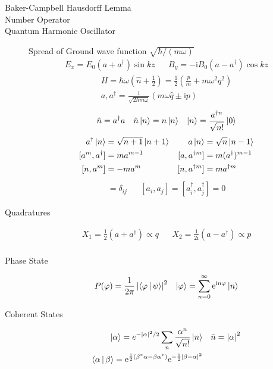 \documentclass[twocolumn, 11pt]{article}
\renewcommand{\i}{\mathrm{i}}
\newcommand{\e}{\mathrm{e}}
\newcommand{\abs}[1]{\left| #1 \right|}
\begin{document}
\begin{description}
\item[Baker-Campbell Hausdorff Lemma] 

\item[Number Operator] 
\item[Quantum Harmonic Oscillator] $ $\\
  Spread of Ground wave function $\sqrt{ \hbar /(m \omega)}$
    \begin{align*}
      E_x = E_0 (a + a^{\dagger}) \sin{k z} &&
      B_y = - \i B_0 (a - a^{\dagger}) \cos{k z}
    \end{align*}
    \begin{align*}
      H = \hbar \omega \left(\hat{n} + \frac{1}{2}\right) =
      \frac{1}{2} \left( \frac{p}{m} + m \omega^2 q^2 \right) \\ a, a^{\dagger} = \frac{1}{\sqrt{2 \hbar m \omega}}(m \omega \hat{q} \pm \i p)
    \end{align*}
    \begin{align*}
      \hat{n} = a^{\dagger} a && \hat{n} \Ket{n} = n \Ket{n} && \Ket{n} = \frac{a^{\dagger n}}{\sqrt{n!}} \Ket{0}
    \end{align*}
    \begin{align*}
      a ^{\dagger} \Ket{n} &= \sqrt{n + 1} \Ket{ n + 1} & a \Ket{n} &= \sqrt{n} \Ket{n - 1} \\
      [a^{m}, a^{\dagger}] &= m a^{m-1} & [a, a^{\dagger m}] &= m (a^{\dagger})^{m-1}  \\
      [n, a^{m}] &= - m a^{m} & [n, a^{\dagger m}] &= m a^{\dagger m}
    \end{align*}
\begin{align*}
  [a_i, a_j ^{\dagger}] = \delta_{ij} && [a_i, a_j] = [a_i^{\dagger}, a_j^{\dagger}] = 0
\end{align*}
%
  \item[Quadratures]
    \begin{align*}
      X_1 = \frac{1}{2}\left( a + a^{\dagger} \right) \propto q &&
      X_2 = \frac{1}{2 \i}\left( a - a^{\dagger} \right) \propto p \\
    \end{align*}
    
  \item[Phase State]
    \begin{align*}
      P(\varphi) = \frac{1}{2 \pi} \abs{\Braket{\varphi | \psi} }^2  &&
    \Ket{\varphi} = \sum_{n=0}^{\infty} \e^{\i n \varphi} \Ket{n}
    \end{align*}
    
  \item[Coherent States]
    \begin{align*}
      \Ket{\alpha} = e^{- \abs{\alpha}^2 /2} \sum_{n}^{} \frac{\alpha^n}{\sqrt{n!}} \Ket{n} && \bar{n} = \abs{\alpha}^2 \\
      \Braket{\alpha | \beta} = \e^{\frac{1}{2} (\beta ^{\ast} \alpha - \beta \alpha^{\ast})}
      \e^{- \frac{1}{2} \abs{\beta - \alpha}^{2}}
    \end{align*}

    
    
  
\end{description}
\end{document}
